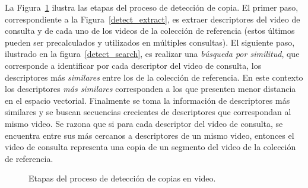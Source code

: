 La Figura~\ref{deteccion_copia} ilustra las etapas del proceso de detección de copia. El primer paso, correspondiente a la Figura~\ref{detect_extract}, es extraer descriptores del video de consulta y de cada uno de los videos de la colección de referencia (estos últimos pueden ser precalculados y utilizados en múltiples consultas). El siguiente paso, ilustrado en la figura~\ref{detect_search}, es realizar una \emph{búsqueda por similitud}, que corresponde a identificar por cada descriptor del video de consulta, los descriptores más \emph{similares} entre los de la colección de referencia. En este contexto los descriptores \emph{más similares} corresponden a los que presenten menor distancia en el espacio vectorial. Finalmente se toma la información de descriptores más similares y se buscan secuencias crecientes de descriptores que correspondan al mismo video. Se razona que si para cada descriptor del video de consulta, se encuentra entre sus más cercanos a descriptores de un mismo video, entonces el video de consulta representa una copia de un segmento del video de la colección de referencia.

\begin{figure}
\centering
{}\par\medskip
{}
\caption{Etapas del proceso de detección de copias en video.}
\label{deteccion_copia}
\end{figure}

